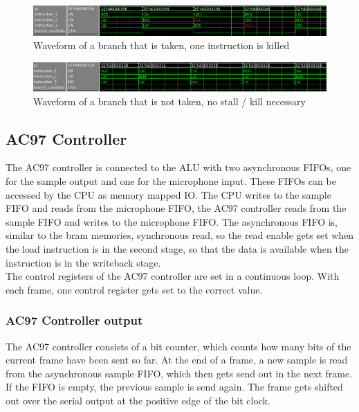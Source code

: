 \documentclass[12pt]{article}
\begin{document}
\begin{figure}[!hbtp]
\centering
\includegraphics[scale=0.35]{branch.png}
\caption{Waveform of a branch that is taken, one instruction is killed}
\label{fig:branch-taken}
\end{figure}


\begin{figure}[!hbtp]
\centering
\includegraphics[scale=0.38]{branch-not.png}
\caption{Waveform of a branch that is not taken, no stall / kill necessary}
\label{fig:branch-not-taken}
\end{figure}

\subsection{AC97 Controller}
The AC97 controller is connected to the ALU with two asynchronous FIFOs, one for the sample output and one for the microphone input. These FIFOs can be accessed by the CPU as memory mapped IO. The CPU writes to the sample FIFO and reads from the microphone FIFO, the AC97 controller reads from the sample FIFO and writes to the microphone FIFO. The asynchronous FIFO is, similar to the bram memories, synchronous read, so the read enable gets set when the load instruction is in the second stage, so that the data is available when the instruction is in the writeback stage.\\
The control registers of the AC97 controller are set in a continuous loop. With each frame, one control register gets set to the correct value.

\subsubsection{AC97 Controller output}
The AC97 controller consists of a bit counter, which counts how many bits of the current frame have been sent so far. At the end of a frame, a new sample is read from the asynchronous sample FIFO, which then gets send out in the next frame. If the FIFO is empty, the previous sample is send again. The frame gets shifted out over the serial output at the positive edge of the bit clock.
\end{document}

